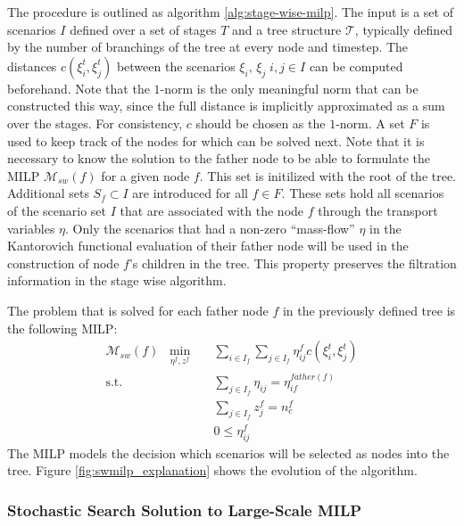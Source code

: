 The procedure is outlined as algorithm \ref{alg:stage-wise-milp}.
The input is a set of scenarios $I$ defined over a set of stages $T$ and a tree structure $\mathcal{T}$, typically defined by the number of branchings of the tree at every node and timestep.
The distances $c(\xi_i^t, \xi_j^t)$ between the scenarios $\xi_i,\,\xi_j\; i,j\in I$ can be computed beforehand.
Note that the $1$-norm is the only meaningful norm that can be constructed this way, since the full distance is implicitly approximated as a sum over the stages.
For consistency, $c$ should be chosen as the $1$-norm.
A set $F$ is used to keep track of the nodes for which can be solved next. Note that it is necessary to know the solution to the father node to be able to formulate the MILP $\mathcal{M}_{sw}(f)$ for a given node $f$. This set is initilized with the root of the tree. Additional sets $S_f\subset I$ are introduced for all $f\in F$. These sets hold all scenarios of the scenario set $I$ that are associated with the node $f$ through the transport variables $\eta$. Only the scenarios that had a non-zero ``mass-flow'' $\eta$ in the Kantorovich functional evaluation of their father node will be used in the construction of node $f$'s children in the tree. This property preserves the filtration information in the stage wise algorithm.

The problem that is solved for each father node $f$ in the previously defined tree is the following MILP:
\begin{eqnarray}
  \label{eq:small-milp-in-alg}
  \mathcal{M}_{sw}(f)\; \; \min_{\eta^f,z^f}&&\sum_{i\in I_f}\sum_{j\in I_f}\eta_{ij}^fc(\xi_i^t,\xi_j^t)\\
  \mathrm{s.t.}&&\sum_{j\in I_f}\eta_{ij} = \eta_{if}^{father(f)}\\
  &&\sum_{j\in I_f}z_j^f = n_c^f\\
  &&0\leq \eta_{ij}^f
\end{eqnarray}
The MILP models the decision which scenarios will be selected as nodes into the tree. Figure \ref{fig:swmilp_explanation} shows the evolution of the algorithm.

\subsubsection{Stochastic Search Solution to Large-Scale MILP}
